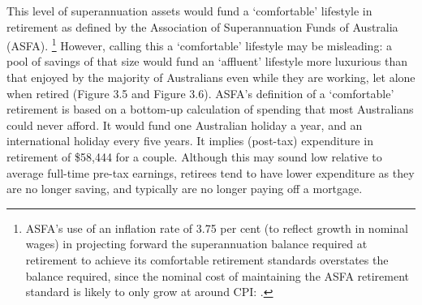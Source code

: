 \documentclass{grattanAlpha}
\begin{document}
This level of superannuation assets would fund a ‘comfortable’ lifestyle in retirement as defined by the Association of Superannuation Funds of Australia (ASFA).%
\footnote{ASFA’s use of an inflation rate of 3.75 per cent (to reflect growth in nominal wages) in projecting forward the superannuation balance required at retirement to achieve its comfortable retirement standards overstates the balance required, since the nominal cost of maintaining the ASFA retirement standard is likely to only grow at around CPI: \textcite[][6]{RothmanBingham2004}.}
However, calling this a ‘comfortable’ lifestyle may be misleading: a pool of savings of that size would fund an ‘affluent’ lifestyle more luxurious than that enjoyed by the majority of Australians even while they are working, let alone when retired (Figure 3.5 and Figure 3.6). ASFA’s definition of a ‘comfortable’ retirement is based on a bottom-up calculation of spending that most Australians could never afford. It would fund one Australian holiday a year, and an international holiday every five years.  It implies (post-tax) expenditure in retirement of \$58,444 for a couple. Although this may sound low relative to average full-time pre-tax earnings, retirees tend to have lower expenditure as they are no longer saving, and typically are no longer paying off a mortgage.
\end{document}
